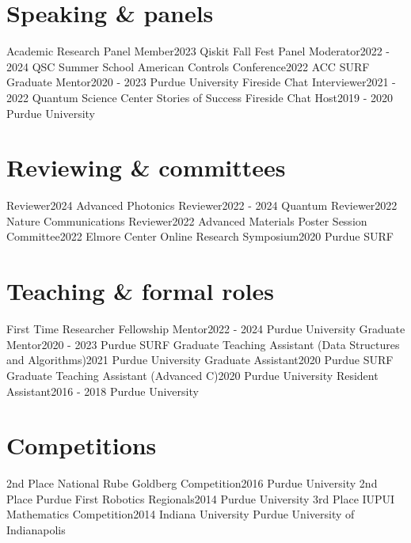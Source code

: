 \section{Speaking \& panels}
  \resumeSubHeadingListStart
    \resumeSubheading
      {Academic Research Panel Member}{2023}
      {Qiskit Fall Fest}{}
    \resumeSubheading
      {Panel Moderator}{2022 - 2024}
      {QSC Summer School}{}
    \resumeSubheading
      {American Controls Conference}{2022}
      {ACC}{}
    \resumeSubheading
      {SURF Graduate Mentor}{2020 - 2023}
      {Purdue University}{}
    \resumeSubheading
      {Fireside Chat Interviewer}{2021 - 2022}
      {Quantum Science Center}{}
    \resumeSubheading
      {Stories of Success Fireside Chat Host}{2019 - 2020}
      {Purdue University}{}
  \resumeSubHeadingListEnd
\section{Reviewing \& committees}
  \resumeSubHeadingListStart
    \resumeSubheading
      {Reviewer}{2024}
      {Advanced Photonics}{}
    \resumeSubheading
      {Reviewer}{2022 - 2024}
      {Quantum}{}
    \resumeSubheading
      {Reviewer}{2022}
      {Nature Communications}{}
    \resumeSubheading
      {Reviewer}{2022}
      {Advanced Materials}{}
    \resumeSubheading
      {Poster Session Committee}{2022}
      {Elmore Center}{}
    \resumeSubheading
      {Online Research Symposium}{2020}
      {Purdue SURF}{}
  \resumeSubHeadingListEnd
\section{Teaching \& formal roles}
  \resumeSubHeadingListStart
    \resumeSubheading
      {First Time Researcher Fellowship Mentor}{2022 - 2024}
      {Purdue University}{}
    \resumeSubheading
      {Graduate Mentor}{2020 - 2023}
      {Purdue SURF}{}
    \resumeSubheading
      {Graduate Teaching Assistant (Data Structures and Algorithms)}{2021}
      {Purdue University}{}
    \resumeSubheading
      {Graduate Assistant}{2020}
      {Purdue SURF}{}
    \resumeSubheading
      {Graduate Teaching Assistant (Advanced C)}{2020}
      {Purdue University}{}
    \resumeSubheading
      {Resident Assistant}{2016 - 2018}
      {Purdue University}{}
  \resumeSubHeadingListEnd
\section{Competitions}
  \resumeSubHeadingListStart
    \resumeSubheading
      {2nd Place National Rube Goldberg Competition}{2016}
      {Purdue University}{}
    \resumeSubheading
      {2nd Place Purdue First Robotics Regionals}{2014}
      {Purdue University}{}
    \resumeSubheading
      {3rd Place IUPUI Mathematics Competition}{2014}
      {Indiana University Purdue University of Indianapolis}{}
  \resumeSubHeadingListEnd

